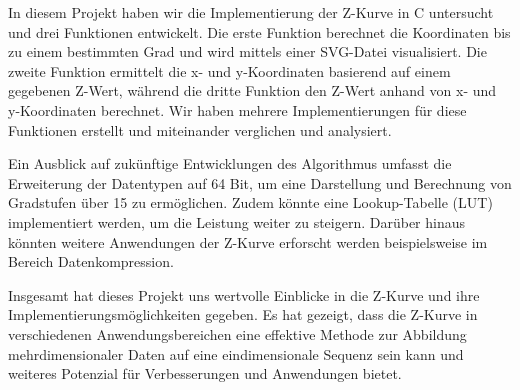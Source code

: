 \documentclass[course=erap]{aspdoc}
\begin{document}
\noindent In diesem Projekt haben wir die Implementierung der Z-Kurve in C untersucht und drei Funktionen entwickelt. Die erste Funktion berechnet die Koordinaten bis zu einem bestimmten Grad und wird mittels einer SVG-Datei visualisiert. Die zweite Funktion ermittelt die x- und y-Koordinaten basierend auf einem gegebenen Z-Wert, während die dritte Funktion den Z-Wert anhand von x- und y-Koordinaten berechnet. Wir haben mehrere Implementierungen für diese Funktionen erstellt und miteinander verglichen und analysiert. 

\noindent Ein Ausblick auf zukünftige Entwicklungen des Algorithmus umfasst die Erweiterung der Datentypen auf 64 Bit, um eine Darstellung und Berechnung von Gradstufen über 15 zu ermöglichen. Zudem könnte eine Lookup-Tabelle (LUT) implementiert werden, um die Leistung weiter zu steigern. Darüber hinaus könnten weitere Anwendungen der Z-Kurve erforscht werden beispielsweise im Bereich Datenkompression.

\noindent Insgesamt hat dieses Projekt uns wertvolle Einblicke in die Z-Kurve und ihre Implementierungsmöglichkeiten gegeben. Es hat gezeigt, dass die Z-Kurve in verschiedenen Anwendungsbereichen eine effektive Methode zur Abbildung mehrdimensionaler Daten auf eine eindimensionale Sequenz sein kann und weiteres Potenzial für Verbesserungen und Anwendungen bietet.


{}
\end{document}
